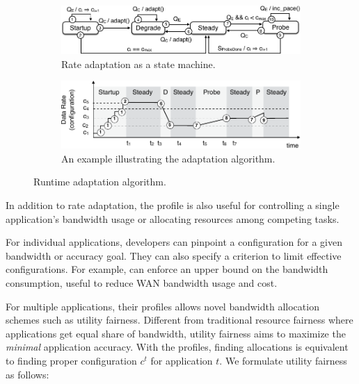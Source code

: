 \begin{figure}
  \begin{subfigure}[t]{\columnwidth}
    \centering
    \includegraphics[width=\columnwidth]{figures/cc.pdf}
    \caption{Rate adaptation as a state machine.}
    \vspace{1em}
    \label{fig:cc-sm}
  \end{subfigure}
  \begin{subfigure}[t]{\columnwidth}
    \centering
    \includegraphics[width=\columnwidth]{figures/cc2.pdf}
    \caption{An example illustrating the adaptation algorithm.}
    \label{fig:cc-ex}
  \end{subfigure}
  \caption{Runtime adaptation algorithm.}
  \label{fig:cc}
\end{figure}

%     

 In addition to rate adaptation, the
profile is also useful for controlling a single application's bandwidth usage or
allocating resources among competing tasks.

For individual applications, developers can pinpoint a configuration for a given
bandwidth or accuracy goal. They can also specify a criterion to limit effective
configurations. For example, \sysname{} can enforce an upper bound on the
bandwidth consumption, useful to reduce WAN bandwidth usage and cost.

For multiple applications, their profiles allows novel bandwidth allocation
schemes such as utility fairness. Different from traditional resource fairness
where applications get equal share of bandwidth, utility fairness aims
to maximize the \textit{minimal} application accuracy. With the profiles,
finding allocations is equivalent to finding proper configuration $c^t$ for
application $t$. We formulate utility fairness as follows:

